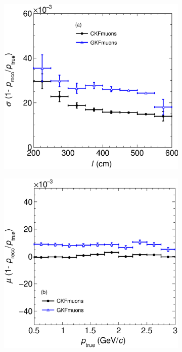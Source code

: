 \begin{figure}[t]
\begin{subfigure}{0.38\textwidth}
         \includegraphics[width=\textwidth]{figures/ch5-KF_NDGAr/FullSample/PGun/pRes/RespVSLength_pgun.eps}
         \caption{}
         \label{fig:pResVSL_PGun}
     \end{subfigure}
     \begin{subfigure}{0.38\textwidth}
         \centering
         \includegraphics[width=\textwidth]{figures/ch5-KF_NDGAr/FullSample/PGun/pRes/BiaspVSp_pgun.eps}

\end{subfigure}
\end{figure}
